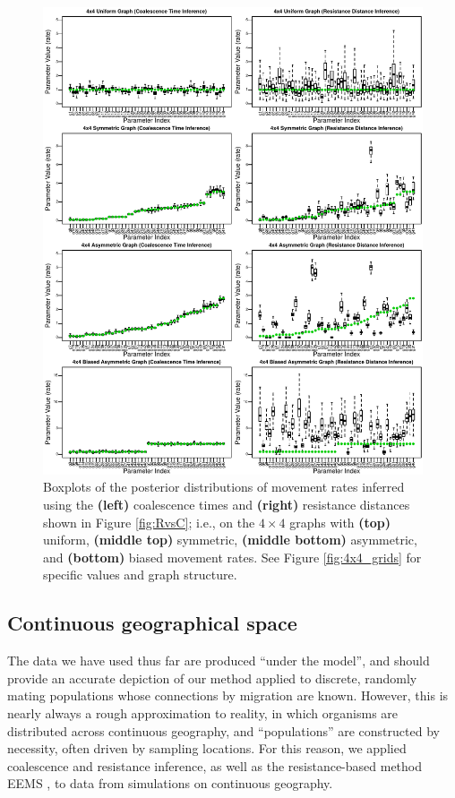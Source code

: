 \documentclass{article}
\begin{document}
\begin{figure}
\centering
     \includegraphics[scale=1]{figs/4x4boxplots_paper2}
    \caption{
        Boxplots of the posterior distributions of movement rates
        inferred using the
        \textbf{(left)} coalescence times
        and \textbf{(right)} resistance distances
        shown in Figure \ref{fig:RvsC};
        i.e., on the $4 \times 4$ graphs with
        \textbf{(top)} uniform,
        \textbf{(middle top)} symmetric,
        \textbf{(middle bottom)} asymmetric,
        and \textbf{(bottom)} biased
        movement rates.
        See Figure \ref{fig:4x4_grids} for specific values and graph structure.
    \label{fig:4x4box}
}
\end{figure}


\subsection*{Continuous geographical space}

The data we have used thus far are produced ``under the model'',
and should provide an accurate depiction of our method applied to discrete, randomly mating populations
whose connections by migration are known.
However, this is nearly always a rough approximation to reality,
in which organisms are distributed across continuous geography,
and ``populations'' are constructed by necessity, often driven by sampling locations.
For this reason, we applied coalescence and resistance inference,
as well as the resistance-based method EEMS \citep{petkova2016visualizing},
to data from simulations on continuous geography.
\end{document}
